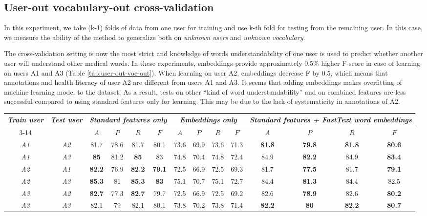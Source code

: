\subsection{User-out vocabulary-out cross-validation}

In this experiment, we take (k-1) folds of data from one user for training and use k-th fold for testing from the remaining user. In this case, we measure the ability of the method to generalize both on \textit{unknown users} and \textit{ unknown vocabulary}.

The cross-validation setting is now the most strict and knowledge of words understandability of one user is used to predict whether another user will understand other medical words. In these experiments, embeddings provide approximately 0.5\% higher F-score in case of learning on users A1 and A3 (Table \ref{tab:user-out-voc-out}). When learning on user A2, embeddings decrease F by 0.5, which means that annotations and health literacy of user A2 are different from users A1 and A3. It seems that adding embeddings makes overfitting of machine learning model to the dataset. As a result, tests on other ``kind of word understandability'' and on combined features are less successful compared to using standard features only for learning. This may be due to the lack of systematicity in annotations of A2.

\begin{table*}[h]
\begin{tabular}{cc|cccc|cccc|cccc}
\multirow{2}{0.6cm}{\textit{Train user}} & \multirow{2}{0.6cm}{\textit{Test user}} & \multicolumn{4}{c|}{\textit{Standard features only}} & \multicolumn{4}{c|}{\textit{Embeddings only}} & \multicolumn{4}{X}{\textit{Standard features + FastText word embeddings}} \\ \cline{3-14} 
 &  & $A$ & $P$ & $R$ & $F$ & $A$ & $P$ & $R$ & $F$ & $A$ & $P$ & $R$ & $F$ \\ \hline
\textit{A1} & \textit{A2} & 81.7 & 78.6 & 81.7 & 80.1 & 73.6 & 69.9 & 73.6 & 71.3 & \textbf{81.8} & \textbf{79.8} & \textbf{81.8} & \textbf{80.6} \\ 
\textit{A1} & \textit{A3} & \textbf{85} & 81.2 & \textbf{85} & 83 & 74.8 & 70.4 & 74.8 & 72.4 & 84.9 & \textbf{82.2} & 84.9 & \textbf{83.4} \\ \hline 
\textit{A2} & \textit{A1} & \textbf{82.2} & 76.9 & \textbf{82.2} & \textbf{79.1} & 72.5 & 66.9 & 72.5 & 69.3 & 81.7 & \textbf{77.5} & 81.7 & \textbf{79.1} \\
\textit{A2} & \textit{A3} & \textbf{85.3} & 81 & \textbf{85.3} & \textbf{83} & 75.1 & 70.7 & 75.1 & 72.7 & 84.4 & \textbf{81.3} & 84.4 & 82.5 \\ \hline 
\textit{A3} & \textit{A2} & \textbf{82.7} & 77.3 & \textbf{82.7} & 79.7 & 72.5 & 66.9 & 72.5 & 69.2 & 82.6 & \textbf{78.9} & 82.6 & \textbf{80.2} \\ 
\textit{A3} & \textit{A3} & 82.1 & 79 & 82.1 & 80.1 & 73.8 & 70.2 & 73.8 & 71.4 & \textbf{82.2} & \textbf{80} & \textbf{82.2} & \textbf{80.7} \\ \hline 
\end{tabular}
    \caption{Experiments on user-out vocabulary-out cross-validation}
    \label{tab:user-out-voc-out}
\end{table*}

